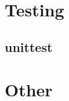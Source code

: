 \documentclass[12pt]{report}
\begin{document}
\newpage
\section*{Testing}
\subsection*{unittest}

\newpage
\section*{Other}
\end{document}
